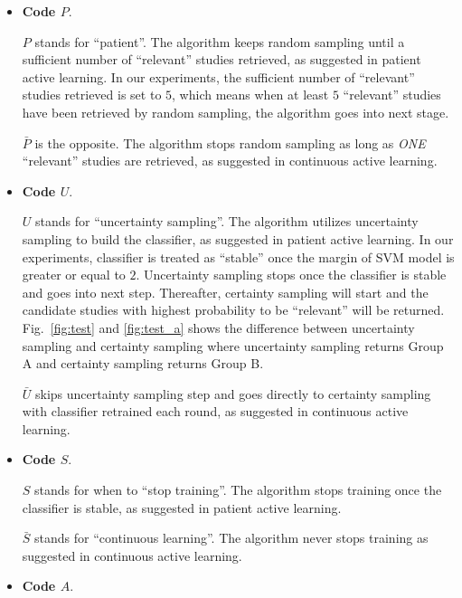 \documentclass{svjour3}
\theoremstyle{break}
\begin{document}
\begin{itemize}

\item
{\bf Code $P$}. 

\textbf{$P$} stands for ``patient''. The algorithm keeps random sampling until a sufficient number of ``relevant'' studies retrieved, as suggested in patient active learning. In our experiments, the sufficient number of ``relevant'' studies retrieved is set to $5$, which means when at least $5$ ``relevant'' studies have been retrieved by random sampling, the algorithm goes into next stage.

\textbf{$\bar{P}$} is the opposite. The algorithm stops random sampling as long as {\em ONE} ``relevant'' studies are retrieved, as suggested in continuous active learning.

\item
{\bf Code $U$}. 

\textbf{$U$} stands for ``uncertainty sampling''. The algorithm utilizes
uncertainty sampling to build the classifier, as suggested in patient active
learning. In our experiments, classifier is treated as ``stable'' once the margin
of SVM model is greater or equal to $2$. Uncertainty sampling stops once the
classifier is stable and goes into next step. Thereafter, certainty sampling
will start and the candidate studies with highest probability to be ``relevant''
will be returned. Fig.~\ref{fig:test} and \ref{fig:test_a} shows the
difference between uncertainty sampling and certainty sampling where uncertainty
sampling returns Group A and certainty sampling returns Group B.

\textbf{$\bar{U}$} skips uncertainty sampling step and goes directly to certainty sampling with classifier retrained each round, as suggested in continuous active learning.

\item
{\bf Code $S$}. 

\textbf{$S$} stands for when to ``stop training''. The algorithm stops training
once the classifier is stable, as suggested in patient active learning.

\textbf{$\bar{S}$} stands for ``continuous learning''. The algorithm never stops
training as suggested in continuous active learning.

\item
{\bf Code $A$}. 


\end{itemize}
\end{document}
